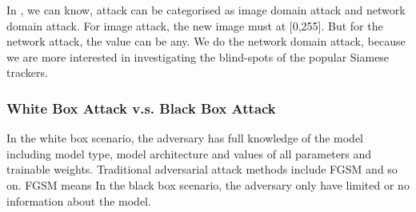 \documentclass{article}
\begin{document}
In \cite{karmon2018lavan}, we can know, attack can be categorised as image domain attack and network domain attack. For image attack, the new image must at [0,255]. But for the network attack, the value can be any. We do the network domain attack, because we are more interested in investigating the blind-spots of the popular Siamese trackers.

\subsubsection{White Box Attack v.s. Black Box Attack}

In the white box scenario, the adversary has full knowledge of the model including model type, model architecture and values of all parameters and trainable weights.
Traditional adversarial attack methods include FGSM \cite{FGSM} and so on. FGSM means In the black box scenario, the adversary only have limited or no information about the model.

\fi
\end{document}
